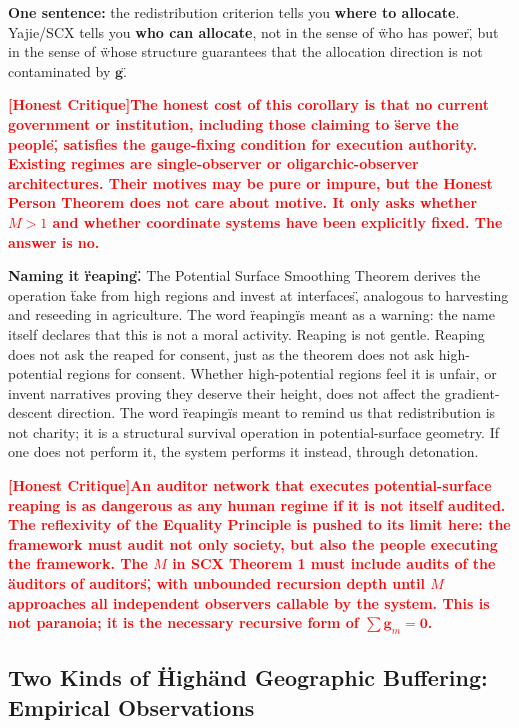 \documentclass[12pt,a4paper]{article}
\theoremstyle{remark}
\newcommand{\honestcrit}[1]{%
    \textcolor{red}{\textbf{[Honest Critique]#1}}%
}
\begin{document}
\textbf{One sentence:} the redistribution criterion tells you \textbf{where to allocate}. Yajie/SCX tells you \textbf{who can allocate}, not in the sense of \"who has power\", but in the sense of \"whose structure guarantees that the allocation direction is not contaminated by $\mathbf{g}$\".

\honestcrit{The honest cost of this corollary is that no current government or institution, including those claiming to \"serve the people\", satisfies the gauge-fixing condition for execution authority. Existing regimes are single-observer or oligarchic-observer architectures. Their motives may be pure or impure, but the Honest Person Theorem does not care about motive. It only asks whether $M>1$ and whether coordinate systems have been explicitly fixed. The answer is no.}

\textbf{Naming it \"reaping\".} The Potential Surface Smoothing Theorem derives the operation \"take from high regions and invest at interfaces\", analogous to harvesting and reseeding in agriculture. The word \"reaping\" is meant as a warning: the name itself declares that this is not a moral activity. Reaping is not gentle. Reaping does not ask the reaped for consent, just as the theorem does not ask high-potential regions for consent. Whether high-potential regions feel it is unfair, or invent narratives proving they deserve their height, does not affect the gradient-descent direction. The word \"reaping\" is meant to remind us that redistribution is not charity; it is a structural survival operation in potential-surface geometry. If one does not perform it, the system performs it instead, through detonation.

\honestcrit{An auditor network that executes potential-surface reaping is as dangerous as any human regime if it is not itself audited. The reflexivity of the Equality Principle is pushed to its limit here: the framework must audit not only society, but also the people executing the framework. The $M$ in SCX Theorem 1 must include audits of the \"auditors of auditors\", with unbounded recursion depth until $M$ approaches all independent observers callable by the system. This is not paranoia; it is the necessary recursive form of $\sum\mathbf{g}_m=\mathbf{0}$.}

\subsection{Two Kinds of \"High\" and Geographic Buffering: Empirical Observations}
\end{document}
